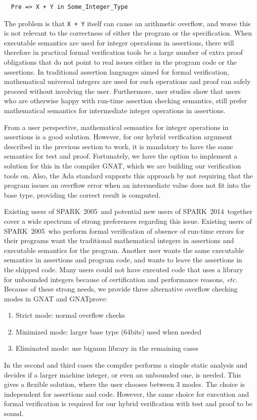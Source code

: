 \documentclass[sttt,final]{svjour}
\newcommand{\gnatprove}{GNATprove\xspace}
\newcommand{\oldspark}{SPARK~2005\xspace}
\newcommand{\newspark}{SPARK~2014\xspace}
\newcommand{\etc}{\textit{etc.}\xspace}
\begin{document}
\begin{lstlisting}
  Pre => X + Y in Some_Integer_Type
\end{lstlisting}

\noindent
The problem is that
\verb|X + Y| itself can cause an arithmetic overflow, and worse this
is not relevant to the correctness of either the program or the
specification. When executable semantics are used for integer
operations in assertions, there will therefore in practical formal
verification tools be a large number of extra proof obligations that do not
point to real issues either in the program code or the assertions. In
traditional assertion languages aimed for formal verification,
mathematical universal integers are used for such operations and proof
can safely proceed without involving the user. Furthermore, user
studies \cite{jotChalin04} show that users who are otherwise happy
with run-time assertion checking semantics, still prefer mathematical
semantics for intermediate integer operations in assertions.

From a user perspective, mathematical semantics for integer operations in
assertions is a good solution. However, for our hybrid verification argument
described in the previous section to work, it is mandatory to have the same
semantics for test and proof. Fortunately, we have the option to implement
a solution for this in the compiler GNAT, which we are building our
verification tools on. Also, the Ada standard supports this approach by not
requiring that the program issues an overflow error when an intermediate value
does not fit into the base type, providing the correct result is computed.

Existing users of \oldspark\ and potential new users of \newspark\
together cover a wide spectrum of strong preferences regarding this
issue. Existing users of \oldspark\ who perform formal verification of
absence of run-time errors for their programs want the traditional
mathematical integers in assertions and executable semantics for the
program. Another user wants the same executable semantics in
assertions and program code, and wants to leave the assertions in the
shipped code. Many users could not have executed code that uses a
library for unbounded integers because of certification and
performance reasons, \etc Because of these strong needs, we provide
three alternative overflow checking modes in GNAT and \gnatprove:
\begin{enumerate}
\item Strict mode: normal overflow checks
\item Minimized mode: larger base type (64bits) used when needed
\item Eliminated mode: use bignum library in the remaining cases
\end{enumerate}
In the second and third cases the compiler performs a simple static
analysis and decides if a larger machine integer, or even an unbounded
one, is needed. This gives a flexible solution, where the user chooses
between 3 modes. The choice is independent for assertions and
code. However, the same choice for execution and formal verification
is required for our hybrid verification with test and proof to be
sound.
\end{document}
